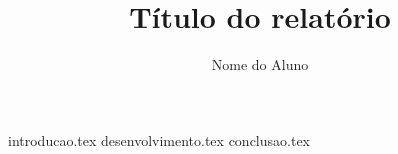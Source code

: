 \documentclass{relatorioUTFPR}
\author{Nome do Aluno}
\title{Título do relatório}
\begin{document}


{introducao.tex}
{desenvolvimento.tex}
{conclusao.tex}

 
\end{document}
